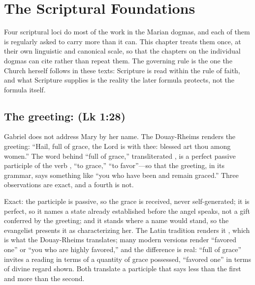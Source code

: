 \sectionguard
\section{The Scriptural Foundations}

Four scriptural loci do most of the work in the Marian dogmas, and each
of them is regularly asked to carry more than it can. This chapter treats
them once, at their own linguistic and canonical scale, so that the
chapters on the individual dogmas can cite rather than repeat them. The
governing rule is the one the Church herself follows in these texts:
Scripture is read within the rule of faith, and what Scripture supplies
is the reality the later formula protects, not the formula itself.

\subsection*{The greeting:  (Lk 1:28)}

Gabriel does not address Mary by her name. The Douay-Rheims renders the
greeting: ``Hail, full of grace, the Lord is with thee: blessed art thou
among women.''
The word behind ``full of grace,'' transliterated ,
is a perfect passive participle of the verb , ``to
grace,'' ``to favor''---so that the greeting, in its grammar, says
something like ``you who have been and remain graced.'' Three
observations are exact, and a fourth is not.

Exact: the participle is passive, so the grace is received, never
self-generated; it is perfect, so it names a state already established
before the angel speaks, not a gift conferred by the greeting; and it
stands where a name would stand, so the evangelist presents it as
characterizing her. The Latin tradition renders it ,
which is what the Douay-Rheims translates; many modern versions render
``favored one'' or ``you who are highly favored,'' and the difference is
real: ``full of grace'' invites a reading in terms of a quantity of
grace possessed, ``favored one'' in terms of divine regard shown. Both
translate a participle that says less than the first and more than the
second.

